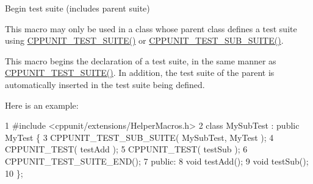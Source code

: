 Begin test suite (includes parent suite) 

This macro may only be used in a class whose parent class defines a test suite using \hyperlink{group___writing_test_fixture_gabe1e12200f40d6f25d60c1783c99da81}{C\+P\+P\+U\+N\+I\+T\+\_\+\+T\+E\+S\+T\+\_\+\+S\+U\+I\+T\+E()} or \hyperlink{group___writing_test_fixture_gae19f30ade82172cf6c3ff297367a10c2}{C\+P\+P\+U\+N\+I\+T\+\_\+\+T\+E\+S\+T\+\_\+\+S\+U\+B\+\_\+\+S\+U\+I\+T\+E()}.

This macro begins the declaration of a test suite, in the same manner as \hyperlink{group___writing_test_fixture_gabe1e12200f40d6f25d60c1783c99da81}{C\+P\+P\+U\+N\+I\+T\+\_\+\+T\+E\+S\+T\+\_\+\+S\+U\+I\+T\+E()}. In addition, the test suite of the parent is automatically inserted in the test suite being defined.

Here is an example\+:


\begin{DoxyCode}
1 #include <cppunit/extensions/HelperMacros.h>
2 class MySubTest : public MyTest \{
3   CPPUNIT\_TEST\_SUB\_SUITE( MySubTest, MyTest );
4   CPPUNIT\_TEST( testAdd );
5   CPPUNIT\_TEST( testSub );
6   CPPUNIT\_TEST\_SUITE\_END();
7 public:
8   void testAdd();
9   void testSub();
10 \};
\end{DoxyCode}



